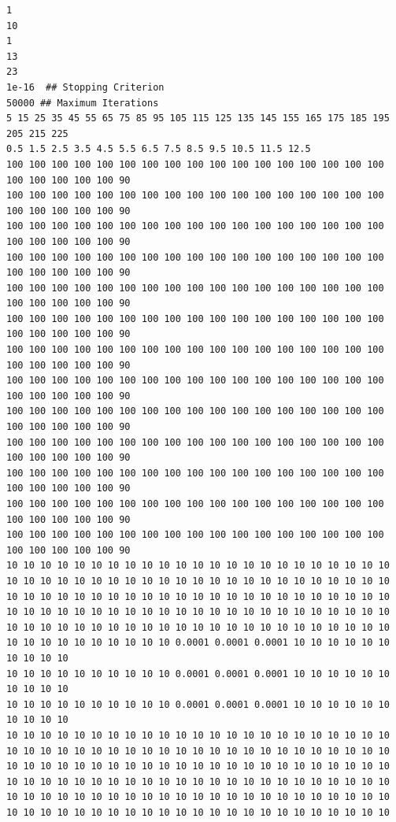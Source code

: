 \begin{lstlisting}[caption= Input file for 2D vertical slice confined aquifer with low permeability inclusion.  The comments in the listing should be removed for running the program , label=lst:2DinclusionInput]
1
10
1
13
23
1e-16  ## Stopping Criterion
50000 ## Maximum Iterations
5 15 25 35 45 55 65 75 85 95 105 115 125 135 145 155 165 175 185 195 205 215 225
0.5 1.5 2.5 3.5 4.5 5.5 6.5 7.5 8.5 9.5 10.5 11.5 12.5
100 100 100 100 100 100 100 100 100 100 100 100 100 100 100 100 100 100 100 100 100 100 90
100 100 100 100 100 100 100 100 100 100 100 100 100 100 100 100 100 100 100 100 100 100 90
100 100 100 100 100 100 100 100 100 100 100 100 100 100 100 100 100 100 100 100 100 100 90
100 100 100 100 100 100 100 100 100 100 100 100 100 100 100 100 100 100 100 100 100 100 90
100 100 100 100 100 100 100 100 100 100 100 100 100 100 100 100 100 100 100 100 100 100 90
100 100 100 100 100 100 100 100 100 100 100 100 100 100 100 100 100 100 100 100 100 100 90
100 100 100 100 100 100 100 100 100 100 100 100 100 100 100 100 100 100 100 100 100 100 90
100 100 100 100 100 100 100 100 100 100 100 100 100 100 100 100 100 100 100 100 100 100 90
100 100 100 100 100 100 100 100 100 100 100 100 100 100 100 100 100 100 100 100 100 100 90
100 100 100 100 100 100 100 100 100 100 100 100 100 100 100 100 100 100 100 100 100 100 90
100 100 100 100 100 100 100 100 100 100 100 100 100 100 100 100 100 100 100 100 100 100 90
100 100 100 100 100 100 100 100 100 100 100 100 100 100 100 100 100 100 100 100 100 100 90
100 100 100 100 100 100 100 100 100 100 100 100 100 100 100 100 100 100 100 100 100 100 90
10 10 10 10 10 10 10 10 10 10 10 10 10 10 10 10 10 10 10 10 10 10 10
10 10 10 10 10 10 10 10 10 10 10 10 10 10 10 10 10 10 10 10 10 10 10
10 10 10 10 10 10 10 10 10 10 10 10 10 10 10 10 10 10 10 10 10 10 10
10 10 10 10 10 10 10 10 10 10 10 10 10 10 10 10 10 10 10 10 10 10 10
10 10 10 10 10 10 10 10 10 10 10 10 10 10 10 10 10 10 10 10 10 10 10
10 10 10 10 10 10 10 10 10 10 0.0001 0.0001 0.0001 10 10 10 10 10 10 10 10 10 10
10 10 10 10 10 10 10 10 10 10 0.0001 0.0001 0.0001 10 10 10 10 10 10 10 10 10 10
10 10 10 10 10 10 10 10 10 10 0.0001 0.0001 0.0001 10 10 10 10 10 10 10 10 10 10
10 10 10 10 10 10 10 10 10 10 10 10 10 10 10 10 10 10 10 10 10 10 10
10 10 10 10 10 10 10 10 10 10 10 10 10 10 10 10 10 10 10 10 10 10 10
10 10 10 10 10 10 10 10 10 10 10 10 10 10 10 10 10 10 10 10 10 10 10
10 10 10 10 10 10 10 10 10 10 10 10 10 10 10 10 10 10 10 10 10 10 10
10 10 10 10 10 10 10 10 10 10 10 10 10 10 10 10 10 10 10 10 10 10 10
10 10 10 10 10 10 10 10 10 10 10 10 10 10 10 10 10 10 10 10 10 10 10

\end{lstlisting}
